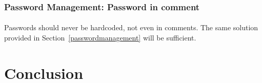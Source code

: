 \documentclass[11pt,english,a4paper]{report}
\begin{document}
\subsubsection{Password Management: Password in comment}
\paragraph{}
Passwords should never be hardcoded, not even in comments.
The same solution provided in Section~\ref{passwordmanagement} will be sufficient.


\section{Conclusion}
\paragraph{}

\newpage




\end{document}
